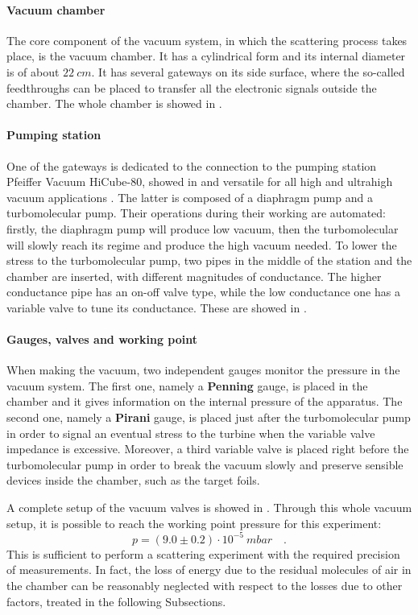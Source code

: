 \documentclass[../../main/main.tex]{subfiles}
\begin{document}
\paragraph{Vacuum chamber}
The core component of the vacuum system, in which the scattering process takes place, is the vacuum chamber. It has a cylindrical form and its internal diameter is of about \( 22 \ \si{cm} \). It has several gateways on its side surface, where the so-called feedthroughs can be placed to transfer all the electronic signals outside the chamber. The whole chamber is showed in .


\paragraph{Pumping station}
One of the gateways is dedicated to the connection to the pumping station Pfeiffer Vacuum HiCube-80, showed in  and versatile for all high and ultrahigh vacuum applications \cite{pfeiffer}. The latter is composed of a diaphragm pump and a turbomolecular pump. Their operations during their working are automated: firstly, the diaphragm pump will produce low vacuum, then the turbomolecular will slowly reach its regime and produce the high vacuum needed. To lower the stress to the turbomolecular pump, two pipes in the middle of the station and the chamber are inserted, with different magnitudes of conductance. The higher conductance pipe has an on-off valve type, while the low conductance one has a variable valve to tune its conductance. These are showed in .


\paragraph{Gauges, valves and working point}
When making the vacuum, two independent gauges monitor the pressure in the vacuum system. The first one, namely a \textbf{Penning} gauge, is placed in the chamber and it gives information on the internal pressure of the apparatus. The second one, namely a \textbf{Pirani} gauge, is placed just after the turbomolecular pump in order to signal an eventual stress to the turbine when the variable valve impedance is excessive. Moreover, a third variable valve is placed right before the turbomolecular pump in order to break the vacuum slowly and preserve sensible devices inside the chamber, such as the target foils.

A complete setup of the vacuum valves is showed in . Through this whole vacuum setup, it is possible to reach the working point pressure for this experiment:
\begin{equation}
    p
    =
    (9.0 \pm 0.2) \cdot 10^{-5} \ \si{mbar}
    \quad .
    \label{eq:vacuum_pressure}
\end{equation}
This is sufficient to perform a scattering experiment with the required precision of measurements. In fact, the loss of energy due to the residual molecules of air in the chamber can be reasonably neglected with respect to the losses due to other factors, treated in the following Subsections.
\end{document}
